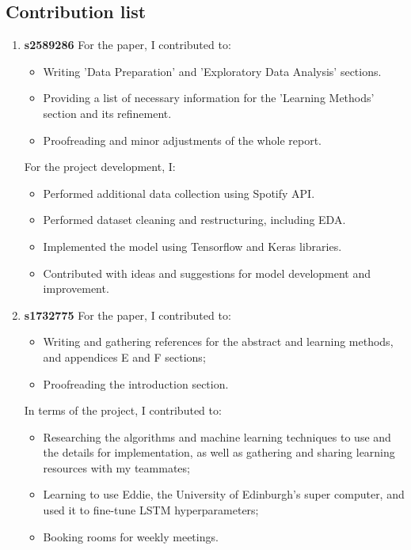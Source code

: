 \documentclass{article}
\begin{document}
\subsection{Contribution list}
\begin{enumerate}
    \item \textbf{s2589286}
 \newline For the paper, I contributed to:
  \begin{itemize}
      \item Writing 'Data Preparation' and 'Exploratory Data Analysis' sections.
      \item Providing a list of necessary information for the 'Learning Methods' section and its refinement.
      \item Proofreading and minor adjustments of the whole report.
    \end{itemize}
  For the project development, I:
  \begin{itemize}
  \item Performed additional data collection using Spotify API.
  \item Performed dataset cleaning and restructuring, including EDA.
  \item Implemented the model using Tensorflow and Keras libraries.
  \item Contributed with ideas and suggestions for model development and improvement.
  \end{itemize}
  
    
    \item \textbf{s1732775}
  \newline For the paper, I contributed to:
  \begin{itemize}
      \item Writing and gathering references for the abstract and learning methods, and appendices E and F sections;
      \item Proofreading the introduction section.
  \end{itemize}
In terms of the project, I contributed to:
  \begin{itemize}
      \item Researching the algorithms and machine learning techniques to use and the details for implementation, as well as gathering and sharing learning resources with my teammates;
      \item Learning to use Eddie, the University of Edinburgh's super computer, and used it to fine-tune LSTM hyperparameters;
      \item Booking rooms for weekly meetings.
  \end{itemize}
  

\end{enumerate}
\end{document}
